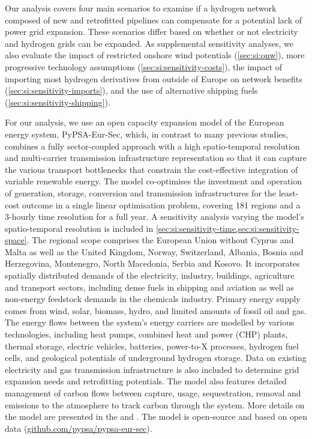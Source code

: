 Our analysis covers four main scenarios to examine if a hydrogen network
composed of new and retrofitted pipelines can compensate for a potential lack of
power grid expansion. These scenarios differ based on whether or not electricity
and hydrogen grids can be expanded. As supplemental sensitivity analyses, we
also evaluate the impact of restricted onshore wind potentials
(\cref{sec:si:onw}), more progressive technology assumptions
(\cref{sec:si:sensitivity-costs}), the impact of importing most hydrogen
derivatives from outside of Europe on network benefits (\cref{sec:si:sensitivity-imports}), and the use
of alternative shipping fuels (\cref{sec:si:sensitivity-shipping}).

For our analysis, we use an open capacity expansion model of the European energy
system, PyPSA-Eur-Sec, which, in contrast to many previous studies,
\cite{henningComprehensiveModel2014,mathiesenSmartEnergy2015,connollySmartEnergy2016,Loffler_2019,blancoPotentialHydrogen2018,brownSynergiesSector2018,in-depth_2018,victoria2020,ludererImpactDeclining2021,gea-bermudezRoleSector2021}
combines a fully sector-coupled approach with a high spatio-temporal resolution
and multi-carrier transmission infrastructure representation so that it can
capture the various transport bottlenecks that constrain the cost-effective
integration of variable renewable energy.\cite{frysztackiStrongEffect2021} The
model co-optimises the investment and operation of generation, storage,
conversion and transmission infrastructures for the least-cost outcome in a
single linear optimisation problem, covering 181 regions and a 3-hourly time
resolution for a full year. A sensitivity analysis varying the model's
spatio-temporal resolution is included in
\cref{sec:si:sensitivity-time,sec:si:sensitivity-space}. The regional scope
comprises the European Union without Cyprus and Malta as well as the United
Kingdom, Norway, Switzerland, Albania, Bosnia and Herzegovina, Montenegro, North
Macedonia, Serbia and Kosovo. It incorporates spatially distributed demands of
the electricity, industry, buildings, agriculture and transport sectors,
including dense fuels in shipping and aviation as well as non-energy feedstock
demands in the chemicals industry. Primary energy supply comes from wind, solar,
biomass, hydro, and limited amounts of fossil oil and gas. The energy flows
between the system's energy carriers are modelled by various technologies,
including heat pumps, combined heat and power (CHP) plants, thermal storage,
electric vehicles, batteries, power-to-X processes, hydrogen fuel cells, and
geological potentials of underground hydrogen storage. Data on existing
electricity and gas transmission infrastructure is also included to determine
grid expansion needs and retrofitting potentials. The model also features
detailed management of carbon flows between capture, usage, sequestration,
removal and emissions to the atmosphere to track carbon through the system. More
details on the model are presented in the  and
. The model is open-source and based on open data
(\href{https://github.com/pypsa/pypsa-eur-sec}{github.com/pypsa/pypsa-eur-sec}).

